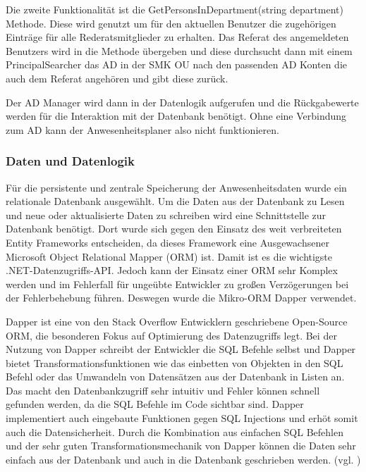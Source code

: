Die zweite Funktionalität ist die GetPersonsInDepartment(string department) Methode. Diese wird genutzt um für den aktuellen Benutzer die zugehörigen Einträge für alle Rederatsmitglieder zu erhalten. Das Referat des angemeldeten Benutzers wird in die Methode übergeben und diese durchsucht dann mit einem PrincipalSearcher das AD in der SMK OU nach den passenden AD Konten die auch dem Referat angehören und gibt diese zurück.

Der AD Manager wird dann in der Datenlogik aufgerufen und die Rückgabewerte werden für die Interaktion mit der Datenbank benötigt. Ohne eine Verbindung zum AD kann der Anwesenheitsplaner also nicht funktionieren.

\subsubsection{Daten und Datenlogik}
\label{sec:Daten}
Für die persistente und zentrale Speicherung der Anwesenheitsdaten wurde ein relationale Datenbank ausgewählt. Um die Daten aus der Datenbank zu Lesen und neue oder aktualisierte Daten zu schreiben wird eine Schnittstelle zur Datenbank benötigt. Dort wurde sich gegen den Einsatz des weit verbreiteten Entity Frameworks entscheiden, da dieses Framework eine Ausgewachsener Microsoft Object Relational Mapper (ORM) ist. Damit ist es die wichtigste .NET-Datenzugriffs-API. Jedoch kann der Einsatz einer ORM sehr Komplex werden und im Fehlerfall für ungeübte Entwickler zu großen Verzögerungen bei der Fehlerbehebung führen. Deswegen wurde die Mikro-ORM Dapper verwendet.

Dapper ist eine von den Stack Overflow Entwicklern geschriebene Open-Source ORM, die besonderen Fokus auf Optimierung des Datenzugriffs legt. Bei der Nutzung von Dapper schreibt der Entwickler die SQL Befehle selbst und Dapper bietet Transformationsfunktionen wie \zB das einbetten von Objekten in den SQL Befehl oder das Umwandeln von Datensätzen aus der Datenbank in Listen an. Das macht den Datenbankzugriff sehr intuitiv und Fehler können schnell gefunden werden, da die SQL Befehle im Code sichtbar sind. Dapper implementiert auch eingebaute Funktionen gegen SQL Injections und erhöt somit auch die Datensicherheit. Durch die Kombination aus einfachen SQL Befehlen und der sehr guten Transformationsmechanik von Dapper können die Daten sehr einfach aus der Datenbank und auch in die Datenbank geschrieben werden. (vgl. \cite{Dapper})

